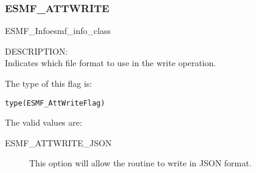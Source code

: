 \subsubsection{ESMF\_ATTWRITE}
\label{const:attwrite}
{ESMF\_Info}{esmf_info_class}

{\sf DESCRIPTION:\\}
Indicates which file format to use in the write operation.

The type of this flag is:

{\tt type(ESMF\_AttWriteFlag)}

The valid values are:
\begin{description}
	\item[ESMF\_ATTWRITE\_JSON]
	This option will allow the routine to write in JSON format.
\end{description}
